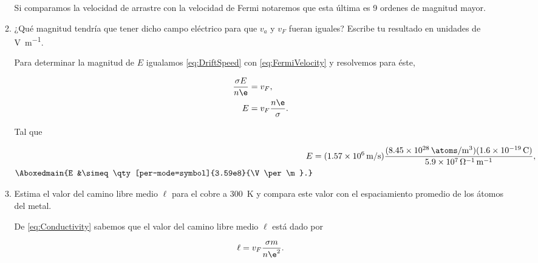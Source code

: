 \documentclass[./../main.tex]{subfiles}
\begin{document}
\begin{exercise}
\begin{enumerate}
\begin{enumerate}[label = (b.\arabic*)]
\begin{solution}
                        Si comparamos la velocidad de arrastre con la velocidad de Fermi notaremos que esta última es 9 ordenes de magnitud mayor.
                    \end{solution}
                    
                    \color{blue}
                    \item ¿Qué magnitud tendría que tener dicho campo eléctrico para que \(v_{a}\) y \(v_{F}\) fueran iguales? Escribe tu resultado en unidades de \unit{\V\per\m}.
                    \color{black}
                    \begin{solution}
                        Para determinar la magnitud de \(E\) igualamos \cref{eq:DriftSpeed} con \cref{eq:FermiVelocity} y resolvemos para éste,

                        \begin{align*}
                            \dfrac{\sigma E}{n\e} &= v_{F},\\
                            E &= v_{F}\dfrac{n\e}{\sigma}.
                        \end{align*}
                        
                        Tal que

                        \begin{align*}
                            E &= (\qty[per-mode=symbol]{1.57e6}{\m\per\s})\dfrac{(\qty[per-mode=symbol]{8.45e28}{\atoms\per\m\cubed})(\qty{1.6e-19}{\C})}{\qty[per-mode=power]{5.9e7}{\per\ohm\per\m}},\\
                            \Aboxedmain{E &\simeq \qty[per-mode=symbol]{3.59e8}{\V\per\m}.}
                        \end{align*}
                    \end{solution}
                    
                    \color{blue}
                    \item Estima el valor del camino libre medio \(\ell\) para el cobre a \qty{300}{\kelvin} y compara este valor con el espaciamiento promedio de los átomos del metal.
                    \color{black}
                    \begin{solution}
                        De \cref{eq:Conductivity} sabemos que el valor del camino libre medio \(\ell\) está dado por

                        \begin{equation*}
                            \ell = v_{F}\dfrac{\sigma m}{n\e^{2}}.
                        \end{equation*}


\end{solution}
\end{enumerate}
\end{enumerate}
\end{exercise}
\end{document}
